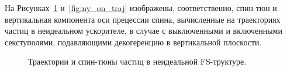 На Рисунках~\ref{fig:spin_tune_on_traj} и~\ref{fig:ny_on_traj} изображены, соответственно, спин-тюн и вертикальная компонента оси прецессии спина, вычисленные на траекториях частиц в неидеальном ускорителе, в случае с выключенными и включенными секступолями, подавляющими декогеренцию в вертикальной плоскости. 
\begin{figure}[!h]
	\centering
	\hfill
	\hfill
	\caption{Траектории и спин-тюны частиц в неидеальной FS-труктуре.\label{fig:spin_tune_on_traj}}
\end{figure}

